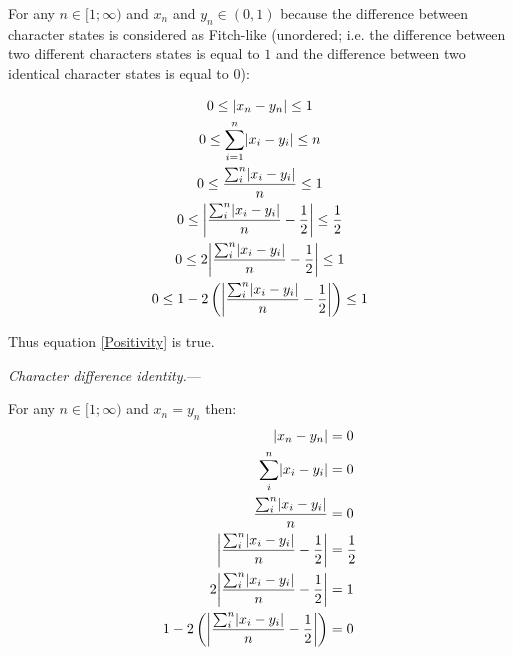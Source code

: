 \documentclass[12pt,letterpaper]{article}
\DeclarePairedDelimiter\abs{\lvert}{\rvert}%
\renewcommand{\subsection}[1]{%
\bigskip
\begin{center}
\begin{large}
\normalfont\itshape #1
\end{large}
\end{center}}
\renewcommand{\subsection}[1]{%
\vspace{2ex}
\noindent
\textit{#1.}---}
\begin{document}
For any $n \in [1;\infty)$ and $x_{n}$ and $y_{n} \in (0,1)$ because the difference between character states is considered as Fitch-like (unordered; i.e. the difference between two different characters states is equal to $1$ and the difference between two identical character states is equal to $0$):

\begin{equation}
    \label{positive_demo}
    \begin{gathered}
    0 \leq  \abs{x_{n}-y_{n}} \leq 1\\
    0 \leq  \sum_{i=1}^{n}\abs{x_{i}-y_{i}} \leq n\\
    0 \leq  \frac{\sum_{i}^{n}\abs{x_{i}-y_{i}}}{n} \leq 1\\
    0 \leq  \abs*{\frac{\sum_{i}^{n}\abs{x_{i}-y_{i}}}{n}-\frac{1}{2}} \leq \frac{1}{2}\\
    0 \leq  2\abs*{\frac{\sum_{i}^{n}\abs{x_{i}-y_{i}}}{n}-\frac{1}{2}} \leq 1\\
    0 \leq  1 - 2\left(\abs*{\frac{\sum_{i}^{n}\abs{x_{i}-y_{i}}}{n}-\frac{1}{2}}\right) \leq 1\\
    \end{gathered}
\end{equation}

Thus equation \ref{Positivity} is true.

\newpage

\subsection{Character difference identity}

For any $n \in [1;\infty)$ and $x_{n} = y_{n}$ then:
\begin{equation}
    \label{identitydemo}
    \begin{aligned}
    \abs{x_{n}-y_{n}} &= 0\\
    \sum_{i}^{n}\abs{x_{i}-y_{i}} &= 0\\
    \frac{\sum_{i}^{n}\abs{x_{i}-y_{i}}}{n} &= 0\\
    \abs*{\frac{\sum_{i}^{n}\abs{x_{i}-y_{i}}}{n}-\frac{1}{2}} &= \frac{1}{2}\\
    2\abs*{\frac{\sum_{i}^{n}\abs{x_{i}-y_{i}}}{n}-\frac{1}{2}} &= 1\\
    1 - 2\left(\abs*{\frac{\sum_{i}^{n}\abs{x_{i}-y_{i}}}{n}-\frac{1}{2}}\right) &= 0\\
    \end{aligned}
\end{equation}
\end{document}
